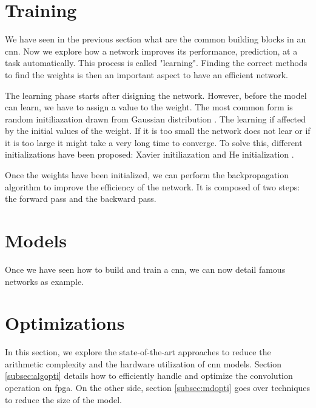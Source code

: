 \section{Training} \label{sec:train}
We have seen in the previous section what are the common building blocks in an \acrshort{cnn}. Now we explore how a network improves its performance, prediction, at a task automatically. This process is called "learning". Finding the correct methods to find the weights is then an important aspect to have an efficient network.

The learning phase starts after disigning the network. However, before the model can learn, we have to assign a value to the weight. The most common form is random initiliazation drawn from Gaussian distribution \cite{he_delving_2015}. The learning if affected by the initial values of the weight. If it is too small the network does not lear or if it is too large it might take a very long time to converge. To solve this, different initializations have been proposed: Xavier initiliazation \cite{glorot_understanding_2010} and He initialization \cite{he_delving_2015}.

Once the weights have been initialized, we can perform the backpropagation algorithm to improve the efficiency of the network. It is composed of two steps: the forward pass and the backward pass.
%
%

%

%
%
\section{Models}
Once we have seen how to build and train a \acrshort{cnn}, we can now detail famous networks as example.
%

%
%
\section{Optimizations}
%
%
In this section, we explore the state-of-the-art approaches to reduce the arithmetic complexity and the hardware utilization of \acrshort{cnn} models. Section \ref{subsec:algopti} details how to efficiently handle and optimize the convolution operation on \acrshort{fpga}. On the other side, section \ref{subsec:mdopti} goes over techniques to reduce the size of the model.
%

%

